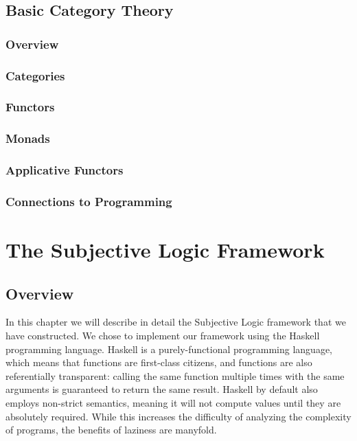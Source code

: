 \documentclass[a4paper]{report}
\begin{document}
\section{Basic Category Theory}

\subsection{Overview}

\subsection{Categories}

\subsection{Functors}

\subsection{Monads}

\subsection{Applicative Functors}

\subsection{Connections to Programming}








\chapter{The Subjective Logic Framework}

\section{Overview}

\par
In this chapter we will describe in detail the Subjective Logic framework
that we have constructed. We chose to implement our framework using the Haskell
programming language. Haskell is a purely-functional programming language, which
means that functions are first-class citizens, and functions are also referentially
transparent: calling the same function multiple times with the same arguments
is guaranteed to return the same result. Haskell by default also employs non-strict
semantics, meaning it will not compute values until they are absolutely required.
While this increases the difficulty of analyzing the complexity of programs, the
benefits of laziness are manyfold.
\end{document}
